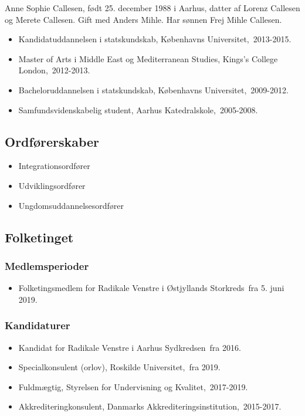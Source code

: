 \documentclass[11pt, a4paper]{awesome-cv}
\begin{document}
\makecvheader[R]
\makelettertitle
\begin{cvletter}
Anne Sophie Callesen, født 25. december 1988 i Aarhus, datter af Lorenz Callesen og Merete Callesen. Gift med Anders Mihle. Har sønnen Frej Mihle Callesen.

\begin{itemize}
\item Kandidatuddannelsen i statskundskab, Københavns Universitet, 2013-2015.
\item Master of Arts i Middle East og Mediterranean Studies, Kings's College London, 2012-2013.
\item Bacheloruddannelsen i statskundskab, Københavns Universitet, 2009-2012.
\item Samfundsvidenskabelig student, Aarhus Katedralskole, 2005-2008.
\end{itemize}
\subsection*{Ordførerskaber}
\begin{itemize}
\item Integrationsordfører
\item Udviklingsordfører
\item Ungdomsuddannelsesordfører
\end{itemize}
\subsection*{Folketinget}
\subsubsection*{Medlemsperioder}
\begin{itemize}
\item Folketingsmedlem for Radikale Venstre i Østjyllands Storkreds fra 5. juni 2019.
\end{itemize}
\subsubsection*{Kandidaturer}
\begin{itemize}
\item Kandidat for Radikale Venstre i Aarhus Sydkredsen fra 2016.
\end{itemize}
\begin{itemize}
\item Specialkonsulent (orlov), Roskilde Universitet, fra 2019.
\item Fuldmægtig, Styrelsen for Undervisning og Kvalitet, 2017-2019.
\item Akkrediteringkonsulent, Danmarks Akkrediteringsinstitution, 2015-2017.
\end{itemize}
\end{cvletter}
\end{document}
